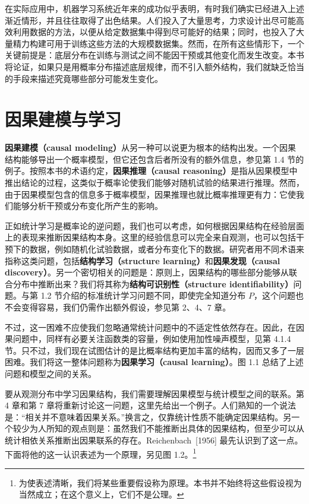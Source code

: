 在实际应用中，机器学习系统近年来的成功似乎表明，有时我们确实已经进入上述渐近情形，并且往往取得了出色结果。人们投入了大量思考，力求设计出尽可能高效利用数据的方法，以便从给定数据集中得到尽可能好的结果；同时，也投入了大量精力构建可用于训练这些方法的大规模数据集。然而，在所有这些情形下，一个关键前提是：底层分布在训练与测试之间不能因干预或其他变化而发生改变。本书将论证，如果只是用概率分布描述底层规律，而不引入额外结构，我们就缺乏恰当的手段来描述究竟哪些部分可能发生变化。


\FloatBarrier
\section{因果建模与学习}
\label{sec:causal-modeling-learning}

\textbf{因果建模（causal modeling）}从另一种可以说更为根本的结构出发。一个因果结构能够导出一个概率模型，但它还包含后者所没有的额外信息，参见第 1.4 节的例子。按照本书的术语约定，\textbf{因果推理（causal reasoning）}是指从因果模型中推出结论的过程，这类似于概率论使我们能够对随机试验的结果进行推理。然而，由于因果模型包含的信息多于概率模型，因果推理也就比概率推理更有力：它使我们能够分析干预或分布变化所产生的影响。

正如统计学习是概率论的逆问题，我们也可以考虑，如何根据因果结构在经验层面上的表现来推断因果结构本身。这里的经验信息可以完全来自观测，也可以包括干预下的数据，例如随机化试验数据，或者分布变化下的数据。研究者用不同术语来指称这类问题，包括\textbf{结构学习（structure learning）}和\textbf{因果发现（causal discovery）}。另一个密切相关的问题是：原则上，因果结构的哪些部分能够从联合分布中推断出来？我们将其称为\textbf{结构可识别性（structure identifiability）}问题。与第 1.2 节介绍的标准统计学习问题不同，即使完全知道分布 $P$，这个问题也不会变得容易，我们仍需作出额外假设，参见第 2、4、7 章。



不过，这一困难不应使我们忽略通常统计问题中的不适定性依然存在。因此，在因果问题中，同样有必要关注函数类的容量，例如使用加性噪声模型，见第 4.1.4 节。只不过，我们现在试图估计的是比概率结构更加丰富的结构，因而又多了一层困难。我们将这一整体问题称为\textbf{因果学习（causal learning）}。图 1.1 总结了上述问题和模型之间的关系。

要从观测分布中学习因果结构，我们需要理解因果模型与统计模型之间的联系。第 4 章和第 7 章将重新讨论这一问题，这里先给出一个例子。人们熟知的一个说法是：“相关并不意味着因果关系。”换言之，仅靠统计性质不能确定因果结构。另一个较少为人所知的观点则是：虽然我们不能推断出具体的因果结构，但至少可以从统计相依关系推断出因果联系的存在。Reichenbach~[1956] 最先认识到了这一点。下面将他的这一认识表述为一个原理，另见图 1.2。\footnote{为使表述清晰，我们将某些重要假设称为原理。本书并不始终将这些假设视为当然成立；在这个意义上，它们不是公理。}

